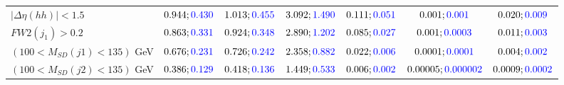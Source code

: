 \begin{landscape}
\begin{table}
\begin{tabular}{lcccccc}
				\rowcolor{black!7}$|\Delta\eta(hh)|<1.5$& $0.944;\textcolor{blue}{0.430}$&$1.013;\textcolor{blue}{0.455}$ &$3.092;\textcolor{blue}{1.490}$ &$0.111;\textcolor{blue}{0.051}$ &$0.001;\textcolor{blue}{0.001}$ &$0.020;\textcolor{blue}{0.009}$\\
				$FW2(j_1)>0.2$ &$0.863;\textcolor{blue}{0.331}$ &$0.924;\textcolor{blue}{0.348}$&$2.890;\textcolor{blue}{1.202}$&$0.085;\textcolor{blue}{0.027}$&$0.001;\textcolor{blue}{0.0003}$&$0.011;\textcolor{blue}{0.003}$\\
				\rowcolor{black!7}$(100<M_{SD}(j1)<135)$ GeV& $0.676;\textcolor{blue}{0.231}$&$0.726;\textcolor{blue}{0.242}$&$2.358;\textcolor{blue}{0.882}$&$0.022;\textcolor{blue}{0.006}$&$0.0001;\textcolor{blue}{0.0001}$&$0.004;\textcolor{blue}{0.002}$\\
				$(100<M_{SD}(j2)<135)$ GeV &$0.386;\textcolor{blue}{0.129}$ &$0.418;\textcolor{blue}{0.136}$ &$1.449;\textcolor{blue}{0.533}$&$0.006;\textcolor{blue}{0.002}$&$0.00005;\textcolor{blue}{0.000002}$&$0.0009;\textcolor{blue}{0.0002}$\\
				\bottomrule
			\end{tabular}
		\end{table}
		

\end{landscape}
